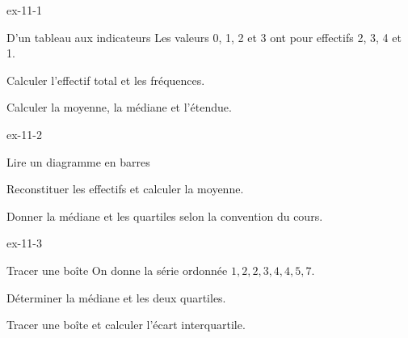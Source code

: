 \begin{blocLivre}{ex-11-1}
\begin{exercice}[1]{D’un tableau aux indicateurs}
Les valeurs 0, 1, 2 et 3 ont pour effectifs 2, 3, 4 et 1.\begin{questions}
\item Calculer l’effectif total et les fréquences.
\item Calculer la moyenne, la médiane et l’étendue.
\end{questions}
\end{exercice}
\end{blocLivre}
\begin{blocLivre}{ex-11-2}
\begin{exercice}[1]{Lire un diagramme en barres}
\begin{center}
\end{center}
\begin{questions}
\item Reconstituer les effectifs et calculer la moyenne.
\item Donner la médiane et les quartiles selon la convention du cours.
\end{questions}
\end{exercice}
\end{blocLivre}
\begin{blocLivre}{ex-11-3}
\begin{exercice}[1]{Tracer une boîte}
On donne la série ordonnée $1,2,2,3,4,4,5,7$.\begin{questions}
\item Déterminer la médiane et les deux quartiles.
\item Tracer une boîte et calculer l’écart interquartile.
\end{questions}
\end{exercice}
\end{blocLivre}
